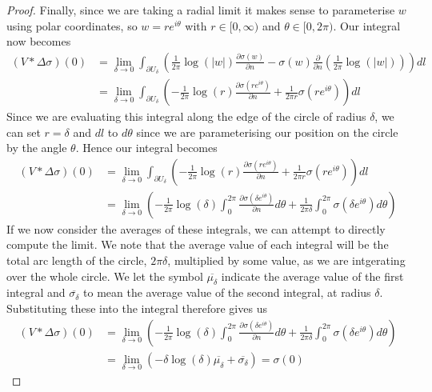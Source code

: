 \documentclass[11pt]{report}
\theoremstyle{definition}
\begin{document}
\begin{proof}
  Finally, since we are taking a radial limit it makes sense to parameterise $w$ using polar coordinates, so $w=re^{i\theta}$ with $r\in [0, \infty)$ and $\theta \in [0, 2\pi)$. Our integral now becomes
  \begin{align*}
    (V * \Delta \sigma)(0) &= \lim_{\delta \rightarrow 0} \int_{\partial U_{\delta}}\left(\frac{1}{2\pi}\log(|w|)\frac{\partial \sigma(w)}{\partial n} - \sigma(w)\frac{\partial}{\partial n}\left(\frac{1}{2\pi}\log(|w|)\right)\right)dl \\
    &= \lim_{\delta \rightarrow 0} \int_{\partial U_{\delta}}\left( -\frac{1}{2\pi}\log(r)\frac{\partial \sigma(re^{i\theta})}{\partial n} + \frac{1}{2\pi r}\sigma(re^{i\theta})\right)dl
  \end{align*}
  Since we are evaluating this integral along the edge of the circle of radius $\delta$, we can set $r=\delta$ and $dl$ to $d\theta$ since we are parameterising our position on the circle by the angle $\theta$. Hence our integral becomes
  \begin{align*}
    (V * \Delta \sigma)(0) &= \lim_{\delta \rightarrow 0} \int_{\partial U_{\delta}}\left( -\frac{1}{2\pi}\log(r)\frac{\partial \sigma(re^{i\theta})}{\partial n} + \frac{1}{2\pi r}\sigma(re^{i\theta})\right)dl \\
    &= \lim_{\delta \rightarrow 0} \left( -\frac{1}{2\pi}\log(\delta) \int_{0}^{2\pi} \frac{\partial \sigma(\delta e^{i\theta})}{\partial n} d\theta + \frac{1}{2\pi \delta}\int_{0}^{2\pi}\sigma(\delta e^{i\theta})d\theta\right)
  \end{align*}
  If we now consider the averages of these integrals, we can attempt to directly compute the limit. We note that the average value of each integral will be the total arc length of the circle, $2\pi \delta$, multiplied by some value, as we are intgerating over the whole circle. We let the symbol $\overline{\mu_{\delta}}$ indicate the average value of the first integral and $\overline{\sigma_{\delta}}$ to mean the average value of the second integral, at radius $\delta$. Substituting these into the integral therefore gives us
  \begin{align*}
    (V * \Delta \sigma)(0) &=\lim_{\delta \rightarrow 0} \left( -\frac{1}{2\pi}\log(\delta) \int_{0}^{2\pi} \frac{\partial \sigma(\delta e^{i\theta})}{\partial n} d\theta + \frac{1}{2\pi \delta}\int_{0}^{2\pi}\sigma(\delta e^{i\theta})d\theta\right) \\
    &= \lim_{\delta \rightarrow 0} \left( -\delta \log(\delta)  \overline{\mu_{\delta}}  + \overline{\sigma_{\delta}}\right) = \sigma(0)

\end{align*}
\end{proof}
\end{document}

